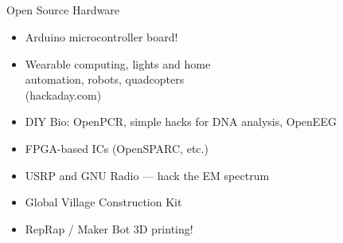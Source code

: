 \documentclass{beamer}
\begin{document}
\subsection{}
\begin{frame}{Open Source Hardware}
\begin{itemize}
\item Arduino microcontroller board!
\item Wearable computing, lights and home \\ automation, robots, quadcopters \\ (hackaday.com)
\item DIY Bio: OpenPCR, simple hacks for DNA analysis, OpenEEG
\item FPGA-based ICs (OpenSPARC, etc.)
\item USRP and GNU Radio --- hack the EM spectrum
\item Global Village Construction Kit
\item RepRap / Maker Bot 3D printing!
\end{itemize}
\end{frame}
\end{document}
